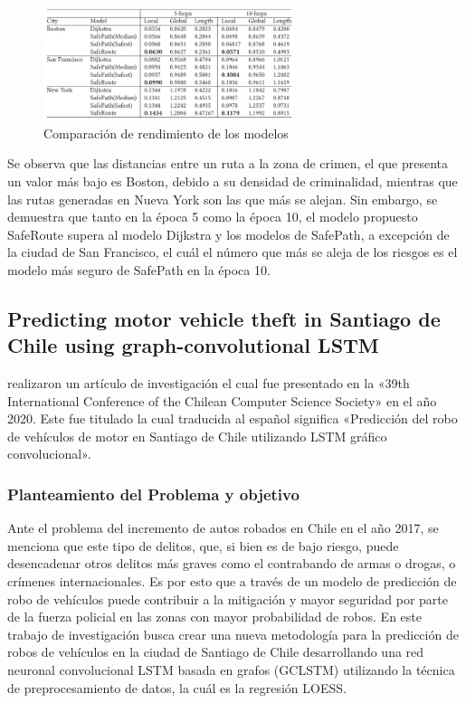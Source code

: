 \begin{figure}[h]
	\begin{center}
		\includegraphics[width=0.65\textwidth]{2/figures/resultSafe.jpg}
		\caption{Comparación de rendimiento de los modelos}
		\label{1:fig2}
	\end{center}
\end{figure}

Se observa que las distancias entre un ruta a la zona de crimen, el que presenta un valor más bajo es Boston, debido a su densidad de criminalidad, mientras que las rutas generadas en Nueva York son las que más se alejan. Sin embargo, se demuestra que tanto en la época 5 como la época 10, el modelo propuesto SafeRoute supera al modelo Dijkstra y los modelos de SafePath, a excepción de la ciudad de San Francisco, el cuál el número que más se aleja de los riesgos es el modelo más seguro de SafePath en la época 10.

\subsection{Predicting motor vehicle theft in Santiago de Chile using graph-convolutional LSTM \citep*{pr_esquivel}}
\citeauthor{pr_esquivel} realizaron un artículo de investigación el cual fue presentado en la «39th International Conference of the Chilean Computer Science Society» en el año 2020. Este fue titulado  la cual traducida al español significa «Predicción del robo de vehículos de motor en Santiago de Chile utilizando LSTM gráfico convolucional».

\subsubsection{Planteamiento del Problema y objetivo }
Ante el problema del incremento de autos robados en Chile en el año 2017, se menciona que este tipo de delitos, que, si bien es de bajo riesgo, puede desencadenar otros delitos más graves como el contrabando de armas o drogas, o crímenes internacionales. Es por esto que a través de un modelo de predicción de robo de vehículos puede contribuir a la mitigación y mayor seguridad por parte de la fuerza policial en las zonas con mayor probabilidad de robos. En este trabajo de investigación busca crear una nueva metodología para la predicción de robos de vehículos en la ciudad de Santiago de Chile desarrollando una red neuronal convolucional LSTM basada en grafos (GCLSTM) utilizando la técnica de preprocesamiento de datos, la cuál es la regresión LOESS.


